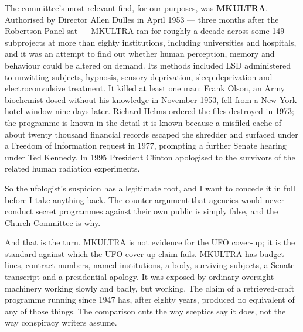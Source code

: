 The committee's most relevant find, for our purposes, was \textbf{MKULTRA}. Authorised by
Director Allen Dulles in April 1953 --- three months after the Robertson Panel sat --- MKULTRA
ran for roughly a decade across some 149 subprojects at more than eighty institutions,
including universities and hospitals, and it was an attempt to find out whether human
perception, memory and behaviour could be altered on demand. Its methods included LSD
administered to unwitting subjects, hypnosis, sensory deprivation, sleep deprivation and
electroconvulsive treatment. It killed at least one man: Frank Olson, an Army biochemist dosed
without his knowledge in November 1953, fell from a New York hotel window nine days later.
Richard Helms ordered the files destroyed in 1973; the programme is known in the detail it is
known because a misfiled cache of about twenty thousand financial records escaped the shredder
and surfaced under a Freedom of Information request in 1977, prompting a further Senate hearing
under Ted Kennedy. In 1995 President Clinton apologised to the survivors of the related human
radiation experiments. 

So the ufologist's suspicion has a legitimate root, and I want to concede it in full before I
take anything back. The counter-argument that agencies would never conduct secret programmes
against their own public is simply false, and the Church Committee is why.


And that is the turn. MKULTRA is not evidence for the UFO cover-up; it is the standard against
which the UFO cover-up claim fails. MKULTRA has budget lines, contract numbers, named
institutions, a body, surviving subjects, a Senate transcript and a presidential apology. It
was exposed by ordinary oversight machinery working slowly and badly, but working. The claim of
a retrieved-craft programme running since 1947 has, after eighty years, produced no equivalent
of any of those things. The comparison cuts the way sceptics say it does, not the way
conspiracy writers assume.

